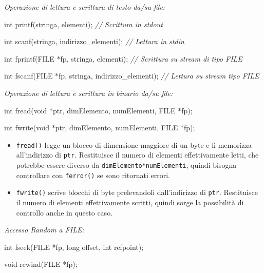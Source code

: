 \documentclass[
]{article}
\newenvironment{Shaded}{}{}
\newcommand{\CommentTok}[1]{\textcolor[rgb]{0.38,0.63,0.69}{\textit{#1}}}
\newcommand{\DataTypeTok}[1]{\textcolor[rgb]{0.56,0.13,0.00}{#1}}
\newcommand{\NormalTok}[1]{#1}
\begin{document}
\emph{Operazione di lettura e scrittura di testo da/su file:}

\begin{Shaded}
\begin{Highlighting}[]
\DataTypeTok{int}\NormalTok{ printf(stringa, elementi);  		  			}\CommentTok{// Scrittura in stdout}

\DataTypeTok{int}\NormalTok{ scanf(stringa, indirizzo\_elementi);   			}\CommentTok{// Lettura in stdin}

\DataTypeTok{int}\NormalTok{ fprintf(}\DataTypeTok{FILE}\NormalTok{ *fp, stringa, elementi); 			}\CommentTok{// Scrittura su stream di tipo FILE}

\DataTypeTok{int}\NormalTok{ fscanf(}\DataTypeTok{FILE}\NormalTok{ *fp, stringa, indirizzo\_elementi);	}\CommentTok{// Lettura su stream tipo FILE}
\end{Highlighting}
\end{Shaded}

\emph{Operazione di lettura e scrittura in binario da/su file:}

\begin{Shaded}
\begin{Highlighting}[]
\DataTypeTok{int}\NormalTok{ fread(}\DataTypeTok{void}\NormalTok{ *ptr, dimElemento, numElementi, }\DataTypeTok{FILE}\NormalTok{ *fp);}

\DataTypeTok{int}\NormalTok{ fwrite(}\DataTypeTok{void}\NormalTok{ *ptr, dimElemento, numElementi, }\DataTypeTok{FILE}\NormalTok{ *fp);}
\end{Highlighting}
\end{Shaded}

\begin{itemize}
\item
  \texttt{fread()} legge un blocco di dimensione maggiore di un byte e
  li memorizza all'indirizzo di \texttt{ptr}. Restituisce il numero di
  elementi effettivamente letti, che potrebbe essere diverso da
  \texttt{dimElemento*numElementi}, quindi bisogna controllare con
  \texttt{ferror()} se sono ritornati errori.
\item
  \texttt{fwrite()} scrive blocchi di byte prelevandoli dall'indirizzo
  di \texttt{ptr}. Restituisce il numero di elementi effettivamente
  scritti, quindi sorge la possibilità di controllo anche in questo
  caso.
\end{itemize}

\emph{Accesso Random a FILE:}

\begin{Shaded}
\begin{Highlighting}[]
\DataTypeTok{int}\NormalTok{ fseek(}\DataTypeTok{FILE}\NormalTok{ *fp, }\DataTypeTok{long}\NormalTok{ offset, }\DataTypeTok{int}\NormalTok{ refpoint);}

\DataTypeTok{void}\NormalTok{ rewind(}\DataTypeTok{FILE}\NormalTok{ *fp);}
\end{Highlighting}
\end{Shaded}
\end{document}
